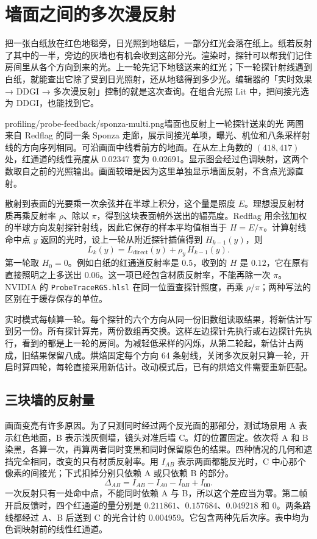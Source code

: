 \clearpage
\section{墙面之间的多次漫反射}
把一张白纸放在红色地毯旁，日光照到地毯后，一部分红光会落在纸上。纸若反射了其中的一半，旁边的灰墙也有机会收到这部分光。渲染时，探针可以帮我们记住房间里从各个方向到来的光。上一轮先记下地毯送来的红光；下一轮探针射线遇到白纸，就能查出它除了受到日光照射，还从地毯得到多少光。编辑器的「实时效果 → DDGI → 多次漫反射」控制的就是这次查询。在组合光照 Lit 中，把间接光选为 DDGI，也能找到它。

     {profiling/probe-feedback/sponza-multi.png}{墙面也反射上一轮探针送来的光}
两图来自 Redflag 的同一条 Sponza 走廊，展示间接光单项，曝光、机位和八条采样射线的方向序列相同。可沿画面中线看前方的地面。在从左上角数的 $(418,417)$ 处，红通道的线性亮度从 0.02347 变为 0.02691。显示图会经过色调映射，这两个数取自之前的光照输出。画面较暗是因为这里单独显示墙面反射，不含点光源直射。

散射到表面的光要乘一次余弦并在半球上积分，这个量是照度 $E$。理想漫反射材质再乘反射率 $\rho$、除以 $\pi$，得到这块表面朝外送出的辐亮度。Redflag 用余弦加权的半球方向发射探针射线，因此它保存的样本平均值相当于 $H=E/\pi$。计算射线命中点 $y$ 返回的光时，设上一轮从附近探针插值得到 $H_{k-1}(y)$，则
\[
   L_k(y) = L_{\mathrm{direct}}(y) + \rho_y\,H_{k-1}(y).
\]
第一轮取 $H_0=0$。例如白纸的红通道反射率是 $0.5$，收到的 $H$ 是 $0.12$，它在原有直接照明之上多送出 $0.06$。这一项已经包含材质反射率，不能再除一次 $\pi$。NVIDIA 的 \texttt{ProbeTraceRGS.hlsl} 在同一位置查探针照度，再乘 $\rho/\pi$；两种写法的区别在于缓存保存的单位。

实时模式每帧算一轮。每个探针的六个方向从同一份旧数组读取结果，将新估计写到另一份。所有探针算完，两份数组再交换。这样左边探针先执行或右边探针先执行，看到的都是上一轮的房间。为减轻低采样的闪烁，从第二轮起，新估计占两成，旧结果保留八成。烘焙固定每个方向 64 条射线，关闭多次反射只算一轮，开启时算四轮，每轮直接采用新估计。改动模式后，已有的烘焙文件需要重新匹配。

\clearpage
\subsection{三块墙的反射量}
画面变亮有许多原因。为了只测同时经过两个反光面的那部分，测试场景用 A 表示红色地面，B 表示浅灰侧墙，镜头对准后墙 C。灯的位置固定。依次将 A 和 B 染黑，各算一次，再算两者同时变黑和同时保留原色的结果。四种情况的几何和遮挡完全相同，改变的只有材质反射率。用 $I_{AB}$ 表示两面都能反光时，C 中心那个像素的间接光；下式扣掉分别只依赖 A 或只依赖 B 的部分。
\[
     \Delta_{AB}= I_{AB} - I_{A0} - I_{0B} + I_{00}.
\]
一次反射只有一处命中点，不能同时依赖 A 与 B，所以这个差应当为零。第二帧开启反馈时，四个红通道的量分别是 $0.211861$、$0.157684$、$0.049218$ 和 $0$。两条路线都经过 A、B 后送到 C 的光合计约 $0.004959$。它包含两种先后次序。表中均为色调映射前的线性红通道。

